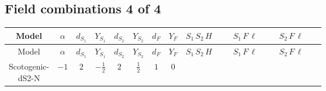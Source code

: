 \documentclass[8pt]{article}
\begin{document}
\begin{landscape}
\subsection*{Field combinations 4 of 4}
\begin{longtable}{@{}cccccccc >{\raggedright\arraybackslash}p{0.21\linewidth} >{\raggedright\arraybackslash}p{0.21\linewidth} >{\raggedright\arraybackslash}p{0.21\linewidth}@{}}
\toprule
Model & $\alpha$ & $d_{S_1}$ & $Y_{S_1}$ & $d_{S_2}$ & $Y_{S_2}$ & $d_F$ & $Y_F$ & $S_1\,S_2\,H$ & $S_1\,F\,\ell$ & $S_2\,F\,\ell$ \\
\midrule
\endfirsthead
\toprule
Model & $\alpha$ & $d_{S_1}$ & $Y_{S_1}$ & $d_{S_2}$ & $Y_{S_2}$ & $d_F$ & $Y_F$ & $S_1\,S_2\,H$ & $S_1\,F\,\ell$ & $S_2\,F\,\ell$ \\
\midrule
\endhead
Scotogenic-dS2-N & $-1$ & $2$ & $-\frac{1}{2}$ & $2$ & $\frac{1}{2}$ & $1$ & $0$ & \scriptsize\adjustbox{max width=\linewidth}{$\begin{gathered} +\overline{\lambda_5} S_{2,j_2} {\mathcal{I}_{T3}}^{*}_{a_1,a_2,j_1,j_2} H_{a_1}{}^{\dagger } H_{a_2}{}^{\dagger } S_{1,j_1}{}^{\dagger } \\ +H_{a_1} H_{a_2} S_{1,j_2} \mathcal{I}_{T3,a_1,a_2,j_2,j_1} \lambda_5 S_{2,j_1}{}^{\dagger }\end{gathered}$} & \scriptsize\adjustbox{max width=\linewidth}{$\begin{gathered} +\overline{L_{a_1,i_1}}\, P_R\, F_{r_1} S_{1,j_1} y_{1,i_1,r_1} \mathcal{I}_{y_1,a_1,j_1} \\ +\overline{y_{1,i_1,r_1}} F_{r_1}{}^T\, C\, P_L\, L_{a_1,i_1} {\mathcal{I}_{y_1}}^{*}_{a_1,j_1} S_{1,j_1}{}^{\dagger }\end{gathered}$} & \scriptsize\adjustbox{max width=\linewidth}{$\begin{gathered} +\overline{y_{2,i_1,r_1}} F_{r_1}{}^T\, C\, P_L\, L_{a_1,i_1} S_{2,j_1} {\mathcal{I}_{y_2}}^{*}_{a_1,j_1} \\ +\overline{L_{a_1,i_1}}\, P_R\, F_{r_1} y_{2,i_1,r_1} \mathcal{I}_{y_2,a_1,j_1} S_{2,j_1}{}^{\dagger }\end{gathered}$} \\
\midrule
\bottomrule
\end{longtable}
\end{landscape}
\end{document}
